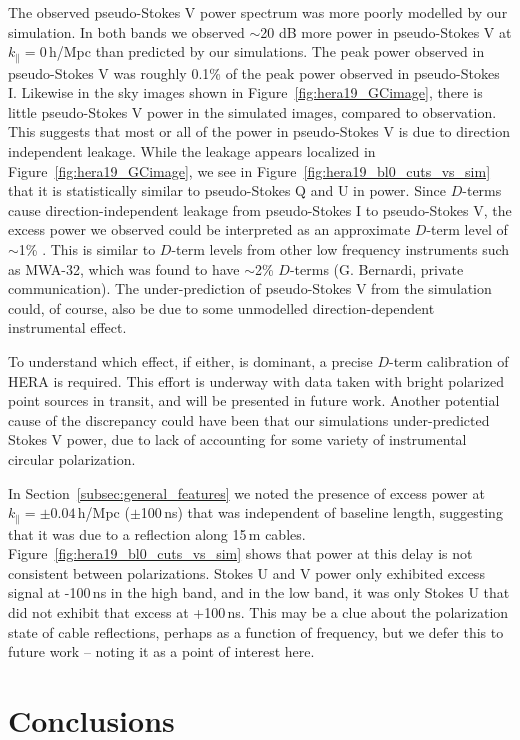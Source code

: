 The observed pseudo-Stokes V power spectrum was more poorly modelled by our simulation. In both bands we observed $\sim$20 dB more power in pseudo-Stokes V at $k_{\parallel}=0$\,h/Mpc than predicted by our simulations. The peak power observed in pseudo-Stokes V was roughly 0.1\% of the peak power observed in pseudo-Stokes I. Likewise in the sky images shown in Figure~\ref{fig:hera19_GCimage}, there is little pseudo-Stokes V power in the simulated images, compared to observation. This suggests that most or all of the power in pseudo-Stokes V is due to direction independent leakage. While the leakage appears localized in Figure~\ref{fig:hera19_GCimage}, we see in Figure~\ref{fig:hera19_bl0_cuts_vs_sim} that it is statistically similar to pseudo-Stokes Q and U in power.
Since $D$-terms cause direction-independent leakage from pseudo-Stokes I to pseudo-Stokes V, the excess power we observed could be interpreted as an approximate $D$-term level of $\sim$1\% \citep{TMS}. This is similar to $D$-term levels from other low frequency instruments such as MWA-32, which was found to have $\sim$2\% $D$-terms (G. Bernardi, private communication). 
The under-prediction of pseudo-Stokes V from the simulation could, of course, also be due to some unmodelled direction-dependent instrumental effect.

To understand which effect, if either, is dominant, a precise $D$-term calibration of HERA is required. This effort is underway with data taken with bright polarized point sources in transit, and will be presented in future work. Another potential cause of the discrepancy could have been that our simulations under-predicted Stokes V power, due to lack of accounting for some variety of instrumental circular polarization.

In Section~\ref{subsec:general_features} we noted the presence of excess power at $k_{\parallel}=\pm 0.04$\,h/Mpc ($\pm$100\,ns) that was independent of baseline length, suggesting that it was due to a reflection along 15\,m cables. Figure~\ref{fig:hera19_bl0_cuts_vs_sim} shows that power at this delay is not consistent between polarizations. Stokes U and V power only exhibited excess signal at -100\,ns in the high band, and in the low band, it was only Stokes U that did not exhibit that excess at +100\,ns. This may be a clue about the polarization state of cable reflections, perhaps as a function of frequency, but we defer this to future work -- noting it as a point of interest here.

\section{Conclusions}
\label{sec:hera19_conc}


